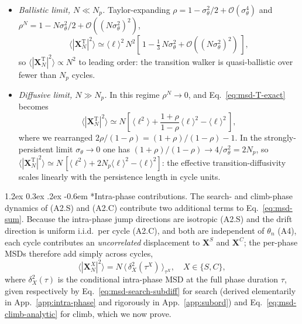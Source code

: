 \documentclass[11pt,a4paper]{article}
\makeatletter
\renewcommand\paragraph{\@startsection{paragraph}{4}{\z@}%
  {1.2ex \@plus 0.3ex \@minus .2ex}%
  {-0.6em}%
  {\normalfont\normalsize\itshape}}
\makeatother
\begin{document}
\begin{itemize}
\setlength{\itemsep}{1.4ex}
\item \emph{Ballistic limit, $N \ll N_p$.}
Taylor-expanding
$\rho = 1 - \sigma_\theta^2/2 + \mathcal{O}(\sigma_\theta^4)$
and
$\rho^N = 1 - N\sigma_\theta^2/2 + \mathcal{O}((N\sigma_\theta^2)^2)$,
\begin{equation}
\langle |\mathbf{X}_N^{\mathrm{T}}|^2 \rangle \simeq
\langle \ell \rangle^2\, N^2
\left[\,1 - \tfrac{1}{3}\,N\sigma_\theta^2
         + \mathcal{O}\!\left((N\sigma_\theta^2)^2\right)\,\right],
\label{eq:msd-ballistic}
\end{equation}
so $\langle |\mathbf{X}_N^{\mathrm{T}}|^2\rangle \propto N^2$ to leading
order: the transition walker is quasi-ballistic over fewer than $N_p$
cycles.

\item \emph{Diffusive limit, $N \gg N_p$.} In this regime
$\rho^N \to 0$, and Eq.~\eqref{eq:msd-T-exact} becomes
\begin{equation}
\langle |\mathbf{X}_N^{\mathrm{T}}|^2 \rangle \simeq
 N\!\left[\, \langle \ell^2 \rangle
         + \frac{1+\rho}{1-\rho}\,\langle \ell \rangle^2
         - \langle \ell\rangle^2 \,\right],
\label{eq:msd-diffusive}
\end{equation}
where we rearranged $2\rho/(1-\rho) = (1+\rho)/(1-\rho) - 1$. In
the strongly-persistent limit $\sigma_\theta \to 0$ one has
$(1+\rho)/(1-\rho) \to 4/\sigma_\theta^2 = 2N_p$, so
$\langle |\mathbf{X}_N^{\mathrm{T}}|^2\rangle \simeq
N\,[\langle\ell^2\rangle + 2N_p\langle\ell\rangle^2 -
\langle\ell\rangle^2]$: the effective transition-diffusivity scales
linearly with the persistence length in cycle units.
\end{itemize}

\paragraph*{Intra-phase contributions.}
The search- and climb-phase dynamics of (A2.S) and (A2.C)
contribute two additional terms to Eq.~\eqref{eq:msd-sum}. Because
the intra-phase jump directions are isotropic (A2.S) and the drift
direction is uniform i.i.d.\ per cycle (A2.C), and both are
independent of $\theta_n$ (A4), each cycle contributes an
\emph{uncorrelated} displacement to $\mathbf{X}^S$ and
$\mathbf{X}^C$; the per-phase MSDs therefore add simply across
cycles,
\begin{equation}
\langle |\mathbf{X}_N^X|^2 \rangle
 = N\,\langle\,\delta^2_X(\tau^X)\,\rangle_{\tau^X},
\quad X \in \{S, C\},
\label{eq:intra-additive}
\end{equation}
where $\delta^2_X(\tau)$ is the conditional intra-phase MSD at the
full phase duration $\tau$, given respectively by
Eq.~\eqref{eq:msd-search-subdiff} for search (derived elementarily
in App.~\ref{app:intra-phase} and rigorously in
App.~\ref{app:subord}) and Eq.~\eqref{eq:msd-climb-analytic} for
climb, which we now prove.
\end{document}
